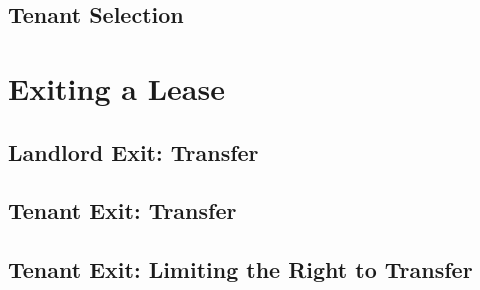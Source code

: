 \subsection{Tenant Selection}



\begin{questions}[Problems]

\end{questions}







\begin{questions}

\end{questions}


\section{Exiting a Lease}




\subsection{Landlord Exit: Transfer}



\subsection{Tenant Exit: Transfer}




\begin{questions}[Problems]

\end{questions}




\subsection{Tenant Exit: Limiting the Right to Transfer}






\begin{questions}

\end{questions}






